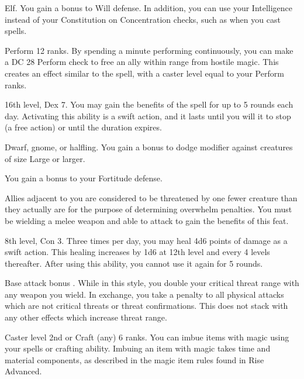  Elf.
 You gain a  bonus to Will defense. In addition, you can use your Intelligence instead of your Constitution on Concentration checks, such as when you cast spells.

\featpre Perform 12 ranks.
\featben By spending a minute performing continuously, you can make a DC 28 Perform check to free an ally within \rngmed range from hostile magic. This creates an effect similar to the  spell, with a caster level equal to your Perform ranks.

\featpre 16th level, Dex 7.
\featben You may gain the benefits of the  spell for up to 5 rounds each day. Activating this ability is a swift action, and it lasts until you will it to stop (a free action) or until the duration expires.

 Dwarf, gnome, or halfling.
 You gain a  bonus to dodge modifier against creatures of size Large or larger.

 You gain a  bonus to your Fortitude defense.

 Allies adjacent to you are considered to be threatened by one fewer creature than they actually are for the purpose of determining overwhelm penalties. You must be wielding a melee weapon and able to attack to gain the benefits of this feat.

\featpre 8th level, Con 3.
\featben Three times per day, you may heal 4d6 points of damage as a swift action. This healing increases by 1d6 at 12th level and every 4 levels thereafter. After using this ability, you cannot use it again for 5 rounds.

 Base attack bonus .
 While in this style, you double your critical threat range with any weapon you wield. In exchange, you take a  penalty to all physical attacks which are not critical threats or threat confirmations. This does not stack with any other effects which increase threat range.

 Caster level 2nd or Craft (any) 6 ranks.
 You can imbue items with magic using your spells or crafting ability. Imbuing an item with magic takes time and material components, as described in the magic item rules found in Rise Advanced.

